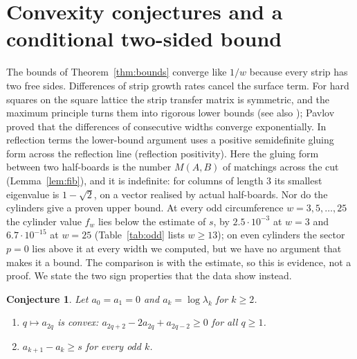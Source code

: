 \documentclass[11pt]{amsart}
\newtheorem{conjecture}[theorem]{Conjecture}
\theoremstyle{definition}
\theoremstyle{remark}
\begin{document}
\section{Convexity conjectures and a conditional two-sided bound}\label{sec:conj}

The bounds of Theorem~\ref{thm:bounds} converge like $1/w$ because every strip has two free
sides. Differences of strip growth rates cancel the surface term. For hard squares on the square
lattice the strip transfer matrix is symmetric, and the maximum principle turns them into
rigorous lower bounds \cite{calkinwilf1998} (see also \cite{louidormarcus2010}); Pavlov
\cite{pavlov2012} proved that the differences of consecutive widths converge exponentially. In
reflection terms the lower-bound argument uses a positive semidefinite gluing form across the
reflection line (reflection positivity). Here the gluing form between two half-boards is the number
$M(A, B)$ of matchings across the cut (Lemma~\ref{lem:fib}), and it is indefinite: for columns of
length $3$ its smallest eigenvalue is $1 - \sqrt2$, on a vector realised by actual half-boards.
Nor do the cylinders give a proven upper bound. At every odd circumference $w = 3, 5, \dots, 25$ the
cylinder value $f_w$ lies below the estimate of $s$, by $2.5\cdot10^{-3}$ at $w = 3$ and
$6.7\cdot10^{-15}$ at $w = 25$ (Table~\ref{tab:odd} lists $w \ge 13$); on even cylinders the sector
$p = 0$ lies above it at every width we computed, but we have no argument that makes it a bound. The
comparison is with the estimate, so this is evidence, not a proof. We state the two sign properties
that the data show instead.

\begin{conjecture}\label{conj:Linf}
Let $a_0 = a_1 = 0$ and $a_k = \log\lambda_k$ for $k \ge 2$.
\begin{enumerate}
\item[(L$_\infty$)] $q \mapsto a_{2q}$ is convex: $a_{2q+2} - 2a_{2q} + a_{2q-2} \ge 0$ for all
  $q \ge 1$.
\item[(O)] $a_{k+1} - a_k \ge s$ for every odd $k$.
\end{enumerate}
\end{conjecture}
\end{document}

